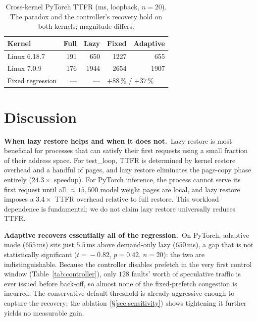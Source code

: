 \documentclass[journal]{IEEEtran}
\begin{document}
\begin{table}[t]
\centering
\caption{Cross-kernel PyTorch TTFR (ms, loopback, $n\!=\!20$). The paradox
and the controller's recovery hold on both kernels; magnitude differs.}
\label{tab:crosskernel}
\renewcommand{\arraystretch}{1.15}
\setlength{\tabcolsep}{5pt}
\small
\begin{tabular}{l r r r r}
\toprule
Kernel & Full & Lazy & Fixed & Adaptive \\
\midrule
Linux 6.18.7 & 191 & 650  & 1227 & 655  \\
Linux 7.0.9  & 176 & 1944 & 2654 & 1907 \\
\midrule
Fixed regression & --- & --- & \multicolumn{2}{l}{$+88\,\%$ / $+37\,\%$} \\
\bottomrule
\end{tabular}
\end{table}

\section{Discussion}
\label{sec:discussion}

\textbf{When lazy restore helps and when it does not.}\, Lazy restore is
most beneficial for processes that can satisfy their first requests using
a small fraction of their address space. For test\_loop, TTFR is determined
by kernel restore overhead and a handful of pages, and lazy restore
eliminates the page-copy phase entirely ($24.3\times$ speedup). For PyTorch
inference, the process cannot serve its first request until all
$\approx 15{,}500$ model weight pages are local, and lazy restore imposes
a $3.4\times$ TTFR overhead relative to full restore. This workload
dependence is fundamental; we do not claim lazy restore universally reduces
TTFR.

\textbf{Adaptive recovers essentially all of the regression.}\, On PyTorch,
adaptive mode ($655$\,ms) sits just $5.5$\,ms above demand-only lazy
($650$\,ms), a gap that is not statistically significant
($t\!=\!-0.82$, $p\!=\!0.42$, $n\!=\!20$): the two are indistinguishable.
Because the controller disables prefetch in the very first control window
(Table~\ref{tab:controller}), only $128$ faults' worth of speculative
traffic is ever issued before back-off, so almost none of the
fixed-prefetch congestion is incurred. The conservative default threshold
is already aggressive enough to capture the recovery; the ablation
(\S\ref{sec:sensitivity}) shows tightening it further yields no measurable
gain.
\end{document}

